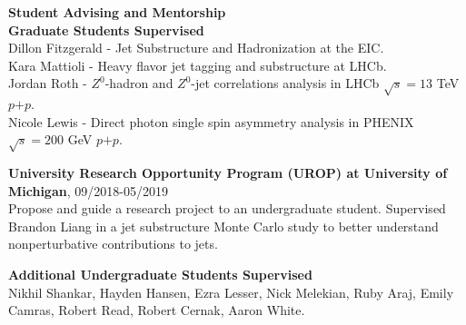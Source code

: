 \documentclass[11pt]{article}
\begin{document}




\begin{flushleft}
\Large \textbf{Student Advising and Mentorship}\\
\normalsize
\vspace{0.3cm}
\textbf{Graduate Students Supervised}\\
Dillon Fitzgerald - Jet Substructure and Hadronization at the EIC. \\
Kara Mattioli - Heavy flavor jet tagging and substructure at LHCb. \\
Jordan Roth - $Z^0$-hadron and $Z^0$-jet correlations analysis in LHCb $\sqrt{s}=13$ TeV $p$$+$$p$. \\
Nicole Lewis - Direct photon single spin asymmetry analysis in PHENIX $\sqrt{s}=200$ GeV $p$$+$$p$. \\

\vspace{0.5cm}

\textbf{University Research Opportunity Program (UROP) at University of Michigan}, 09/2018-05/2019\\
Propose and guide a research project to an undergraduate student. Supervised Brandon Liang in a jet substructure Monte Carlo study to better understand nonperturbative contributions to jets.\\
\vspace*{0.3cm}

\textbf{Additional Undergraduate Students Supervised}\\
Nikhil Shankar, Hayden Hansen, Ezra Lesser, Nick Melekian, Ruby Araj, Emily Camras, Robert Read, Robert Cernak, Aaron White.
\end{flushleft}
\end{document}
